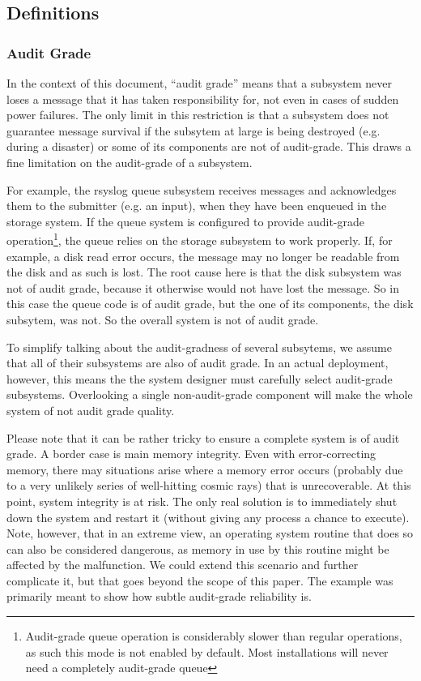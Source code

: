 \documentclass[a4paper,10pt]{article}
\begin{document}
\subsection{Definitions}
\subsubsection{Audit Grade}
In the context of this document, ``audit grade'' means that a subsystem never loses a message that it has taken responsibility for, not even in cases of sudden power failures. The only limit in this restriction is that a subsystem does not guarantee message survival if the subsytem at large is being destroyed (e.g. during a disaster) or some of its components are not of audit-grade. This draws a fine limitation on the audit-grade of a subsystem.

For example, the rsyslog queue subsystem receives messages and acknowledges them to the submitter (e.g. an input), when they have been enqueued in the storage system. If the queue system is configured to provide audit-grade operation\footnote{Audit-grade queue operation is considerably slower than regular operations, as such this mode is not enabled by default. Most installations will never need a completely audit-grade queue}, the queue relies on the storage subsystem to work properly. If, for example, a disk read error occurs, the message may no longer be readable from the disk and as such is lost. The root cause here is that the disk subsystem was not of audit grade, because it otherwise would not have lost the message. So in this case the queue code is of audit grade, but the one of its components, the disk subsytem, was not. So the overall system is not of audit grade.

To simplify talking about the audit-gradness of several subsytems, we assume that all of their subsystems are also of audit grade. In an actual deployment, however, this means the the system designer must carefully select audit-grade subsystems. Overlooking a single non-audit-grade component will make the whole system of not audit grade quality.

Please note that it can be rather tricky to ensure a complete system is of audit grade. A border case is main memory integrity. Even with error-correcting memory, there may situations arise where a memory error occurs (probably due to a very unlikely series of well-hitting cosmic rays) that is unrecoverable. At this point, system integrity is at risk. The only real solution is to immediately shut down the system and restart it (without giving any process a chance to execute). Note, however, that in an extreme view, an operating system routine that does so can also be considered dangerous, as memory in use by this routine might be affected by the malfunction. We could extend this scenario and further complicate it, but that goes beyond the scope of this paper. The example was primarily meant to show how subtle audit-grade reliability is.
\end{document}
